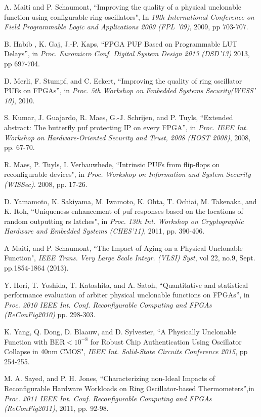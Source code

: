 ﻿\documentclass[aps,preprint,prb,superscriptaddress,amsmath,showpacs,tightenlines]{revtex4}
\begin{document}
\begin{thebibliography}{99}
 A. Maiti and P. Schaumont, ``Improving the quality of
a physical unclonable function using configurable ring
oscillators", In {\it 19th International Conference on Field
Programmable Logic and Applications 2009
(FPL '09)}, 2009, pp 703-707.


 B. Habib , K. Gaj, J.-P. Kaps, “FPGA PUF Based on Programmable
LUT Delays”, in {\it Proc. Euromicro Conf. Digital System Design 2013 (DSD'13)} 
2013, pp 697-704.

 D. Merli, F. Stumpf, and C. Eckert, “Improving the quality of ring oscillator
PUFs on FPGAs”, in {\it Proc. 5th Workshop on Embedded
Systems Security(WESS' 10)}, 2010.



  S. Kumar, J. Guajardo, R. Maes, G.-J. Schrijen, and P. Tuyls, “Extended
abstract: The butterfly puf protecting IP on every FPGA”, in
{\it Proc. IEEE Int. Workshop on Hardware-Oriented Security and Trust,
2008 (HOST 2008)}, 2008, pp. 67-70.

R. Maes, P. Tuyls, I. Verbauwhede, 
``Intrinsic PUFs from flip-flops on reconfigurable devices", in {\it Proc. Workshop
on Information and System Security (WISSec)}. 2008, pp. 17-26.

 D. Yamamoto, K. Sakiyama, M. Iwamoto, K. Ohta, T. Ochiai, M. Takenaka, and
K. Itoh, ``Uniqueness enhancement of puf responses based on the locations of random
outputting rs latches",
in {\it Proc. 13th Int. Workshop on
Cryptographic Hardware and Embedded Systems (CHES’11)}, 2011,
pp. 390-406.

A Maiti, and P. Schaumont, 
``The Impact of Aging on a Physical Unclonable Function",
{\it IEEE Trans. Very Large
Scale Integr. (VLSI) Syst}, vol 22, no.9, Sept. pp.1854-1864 (2013).

 Y. Hori, T. Yoshida, T. Katashita, and A. Satoh, “Quantitative
and statistical performance evaluation of arbiter physical unclonable
functions on FPGAs”, in 
{\it Proc. 2010 IEEE Int. Conf. Reconfigurable Computing and FPGAs (ReConFig2010)}
pp. 298-303.

K. Yang, Q. Dong, D. Blaauw, and D. Sylvester,
``A Physically Unclonable Function with BER$<10^{-8}$ for
Robust Chip Authentication Using Oscillator Collapse
in 40nm CMOS",
{\it IEEE Int. Solid-State Circuits Conference  2015}, pp 254-255.


M. A. Sayed, and P. H. Jones, “Characterizing non-Ideal Impacts of Reconfigurable Hardware Workloads on Ring Oscillator-based Thermometers”,in {\it Proc. 2011 IEEE Int. Conf. Reconfigurable Computing and FPGAs (ReConFig2011)}, 2011, pp. 92-98.

\end{thebibliography}
\end{document}
